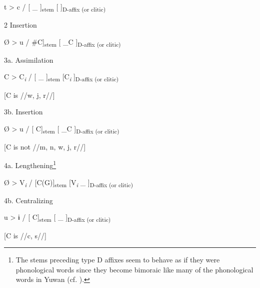     t  >  c  /  [    \_ ]\textsubscript{stem}  [  ]\textsubscript{D-affix (or clitic)}

  2  Insertion

    Ø  >  u  /  \#C]\textsubscript{stem}  [ \_C  ]\textsubscript{D-affix (or clitic)}

  3a.  Assimilation

    C  >  C\textit{\textsubscript{i}}  /  [    \_ ]\textsubscript{stem}  [C\textit{\textsubscript{i}}  ]\textsubscript{D-affix (or clitic)}

    [C is //w, j, r//]      

  3b.  Insertion

    Ø  >  u  /  [     C]\textsubscript{stem}  [ \_C  ]\textsubscript{D-affix (or clitic)}

        [C is not //m, n, w, j, r//]  

  4a.  Lengthening\footnote{The stems preceding type D affixes seem to behave as if they were phonological words since they become bimoraic like many of the phonological words in Yuwan (cf. ).}

    Ø  >  V\textit{\textsubscript{i}}  /  [C(G)]\textsubscript{stem}  [V\textit{\textsubscript{i}} \_   ]\textsubscript{D-affix (or clitic)}

  4b.  Centralizing

    u  >  ɨ  /  [    C]\textsubscript{stem}  [ \_  ]\textsubscript{D-affix (or clitic)}

            [C is //c, s//]    
\z

